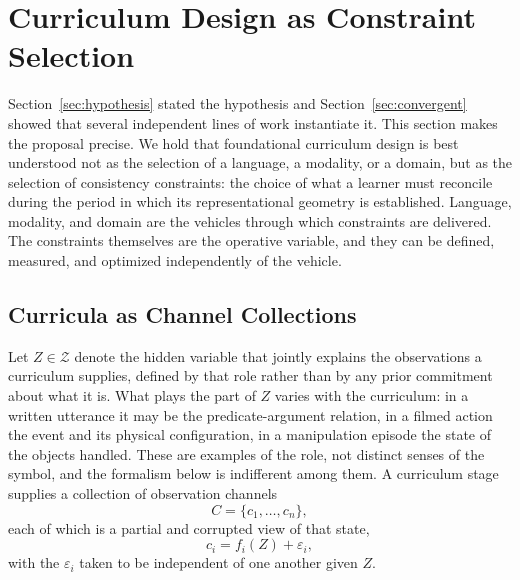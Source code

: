 \documentclass[11pt]{article}
\begin{document}
\section{Curriculum Design as Constraint Selection}
\label{sec:constraint}

Section~\ref{sec:hypothesis} stated the hypothesis and Section~\ref{sec:convergent} showed that several independent lines of work instantiate it. This section makes the proposal precise. We hold that foundational curriculum design is best understood not as the selection of a language, a modality, or a domain, but as the selection of consistency constraints: the choice of what a learner must reconcile during the period in which its representational geometry is established. Language, modality, and domain are the vehicles through which constraints are delivered. The constraints themselves are the operative variable, and they can be defined, measured, and optimized independently of the vehicle.

\subsection{Curricula as Channel Collections}

Let $Z\in\mathcal{Z}$ denote the hidden variable that jointly explains the observations a curriculum supplies, defined by that role rather than by any prior commitment about what it is. What plays the part of $Z$ varies with the curriculum: in a written utterance it may be the predicate-argument relation, in a filmed action the event and its physical configuration, in a manipulation episode the state of the objects handled. These are examples of the role, not distinct senses of the symbol, and the formalism below is indifferent among them. A curriculum stage supplies a collection of observation channels
\[
C=\{c_1,\ldots,c_n\},
\]
each of which is a partial and corrupted view of that state,
\[
c_i=f_i(Z)+\varepsilon_i,
\]
with the $\varepsilon_i$ taken to be independent of one another given $Z$.
\end{document}

